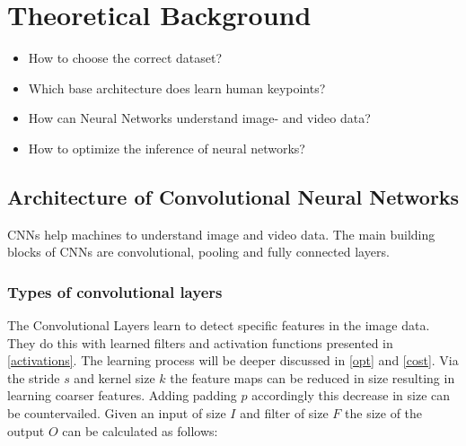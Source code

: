 


\chapter{Theoretical Background} %

\label{theory} %


\begin{itemize}
    \item How to choose the correct dataset?
    \item Which base architecture does learn human keypoints?
    \item How can Neural Networks understand image- and video data?
    \item How to optimize the inference of neural networks?

\end{itemize}


\section{Architecture of Convolutional Neural Networks}
\glspl{CNN} help machines to understand image and video data.
The main building blocks of \glspl{CNN} are convolutional, pooling and fully connected layers.
\subsection{Types of convolutional layers}
The Convolutional Layers learn to detect specific features in the image data.
They do this with learned filters and activation functions presented in \autoref{activations}.
The learning process will be deeper discussed in \autoref{opt} and \autoref{cost}.
Via the stride $s$ and kernel size $k$ the feature maps can be reduced in size resulting in
learning coarser features.
Adding padding $p$ accordingly this decrease in size can be countervailed.
Given an input of size $I$ and filter of size $F$ the size of the output $O$ can be calculated as follows:


